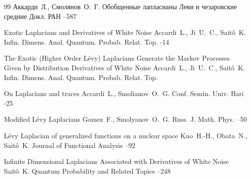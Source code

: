 \begin{thebibliography}{99}
\by Аккарди~Л., Смолянов~О.~Г.
\paper Обобщенные лапласианы Леви и чезаровские средние
\jour Докл. РАН
--587



\paper  Exotic Laplacians and  Derivatives of White Noise
\by Accardi~L., Ji~U.~C., Sait\^{o}~K.
\jour Infin. Dimens. Anal. Quantum. Probab. Relat. Top. 
-14



\paper  The Exotic (Higher Order L\'{e}vy) Laplacians Generate the Markov Processes Given by Distribution Derivatives of White  Noise
\by  Accardi~L., Ji~U.~C., Sait\^{o}~K.
\jour Infin. Dimens. Anal. Quantum. Probab. Relat. Top. 


\paper  On Laplacians and traces
\by  Accardi~L., Smolianov~O.~G.
\jour Conf. Semin. Univ. Bari
-25



\paper Modified L\'{e}vy Laplacians
\by Gomez~F., Smolyanov~O.~G.
\jour Russ. J. Math. Phys.
--50


\paper  L\'{e}vy Laplacian of generalized functions on a nuclear space
\by Kuo~H.-H., Obata~N., Sait\^{o}~K.
\jour Journal of Functional Analysis
--92


\paper Infinite Dimensional Laplacians Associated with Derivatives of White Noise
\by Sait\^{o}~K.
\jour  Quantum Probability and Related Topics
--248





\end{thebibliography}
